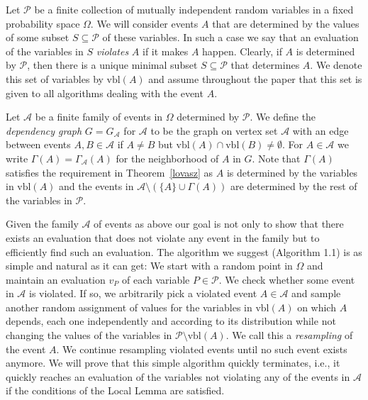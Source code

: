 \documentclass[11pt,a4paper]{article}
\begin{document}
Let $\mathcal P$ be a finite collection of mutually independent random
variables in a fixed probability space $\Omega$. We will consider events $A$
that are determined by the values of some subset $S\subseteq\mathcal P$ of
these variables. In such a case we say that an evaluation of the variables
in $S$ \emph{violates} $A$ if it makes $A$ happen. Clearly, if $A$ is
determined by $\mathcal P$, then there is a unique minimal subset
$S\subseteq\mathcal{P}$ that determines $A$. We denote this set of variables by
$\mbox{vbl}(A)$ and assume throughout the paper that this set is given to
all algorithms dealing with the event $A$. 

Let $\mathcal{A}$ be a finite family of events in
$\Omega$ determined by $\mathcal P$. We define the \emph{dependency graph}
$G=G_{\mathcal A}$ for $\mathcal A$ to be the graph on vertex set $\mathcal{A}$ with an edge
between events $A,B \in \mathcal{A}$ if
$A \ne B$ but $\mbox{vbl}(A) \cap \mbox{vbl}(B) \ne \emptyset$.
For $A\in \mathcal A$ we write $\Gamma(A)=\Gamma_{\mathcal A}(A)$ for the neighborhood of $A$ in $G$. Note that $\Gamma(A)$ satisfies the requirement in
Theorem~\ref{lovasz} as $A$ is determined by the variables in $\mbox{vbl}(A)$
and the events in $\mathcal A\setminus(\{A\}\cup\Gamma(A))$ are determined by
the rest of the variables in $\mathcal P$.

Given the family $\mathcal A$ of events as above our goal is not only to show
that there exists an evaluation that does not violate any event in the family
but to efficiently find such an evaluation. The algorithm we suggest (Algorithm 1.1) 
is as simple and natural as it can get: We start with a random point in $\Omega$ and
maintain an evaluation $v_P$ of each variable $P \in \mathcal P$. We check whether
some event in $\mathcal A$ is violated. If so, we arbitrarily pick a violated
event $A\in\mathcal A$ and sample another random assignment of values for the
variables in $\mbox{vbl}(A)$ on which $A$ depends, each one independently and
according to its distribution while not changing the values of the variables in
$\mathcal P\setminus\mbox{vbl}(A)$. We call this a \emph{resampling} of the
event $A$. We continue resampling violated events until no such event exists
anymore. We will prove that this simple algorithm quickly terminates, i.e., it
quickly reaches an evaluation of the variables not violating any of the events in
$\mathcal A$ if the conditions of the Local Lemma are satisfied.

\end{document}
